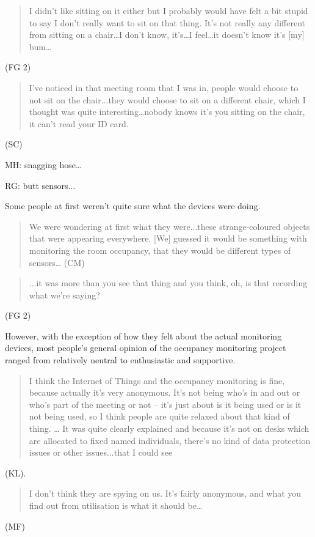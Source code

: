 \begin{quote}I didn’t like sitting on it either but I probably would have felt a
bit stupid to say I don’t really want to sit on that thing. It’s not
really any different from sitting on a chair…I don’t know, it’s…I
feel…it doesn’t know it’s [my] bum…\end{quote} (FG 2)

\begin{quote}I’ve noticed in that meeting room that I was in, people would choose
to not sit on the chair...they would choose to sit on a different
chair, which I thought was quite interesting…nobody knows it’s you
sitting on the chair, it can’t read your ID card.\end{quote} (SC)

MH: snagging hose…

RG: butt sensors...

Some people at first weren’t quite sure what the devices were doing.
\begin{quote}We were wondering at first what they were...these strange-coloured
objects that were appearing everywhere. [We] guessed it would be
something with monitoring the room occupancy, that they would be
different types of sensors… (CM)\end{quote}

\begin{quote}...it was more than you see that thing and you think, oh, is that
recording what we’re saying?\end{quote} (FG 2) 

However, with the exception of how they felt about the actual
monitoring devices, most people’s general opinion of the occupancy
monitoring project ranged from relatively neutral to enthusiastic and
supportive.

\begin{quote}I think the Internet of Things and the occupancy monitoring is fine,
because actually it’s very anonymous. It’s not being who’s in and out
or who’s part of the meeting or not – it’s just about is it being used
or is it not being used, so I think people are quite relaxed about
that kind of thing. … It was quite clearly explained and because it’s
not on desks which are allocated to fixed named individuals, there’s
no kind of data protection issues or other issues...that I could see\end{quote}
(KL).

\begin{quote}I don’t think they are spying on us. It’s fairly anonymous, and what
you find out from utilisation is what it should be…\end{quote} (MF)

